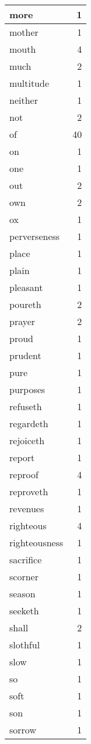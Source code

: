 \begin{center}
\begin{longtable}{l|r}
more & 1\\ \hline 
mother & 1\\ \hline 
mouth & 4\\ \hline 
much & 2\\ \hline 
multitude & 1\\ \hline 
neither & 1\\ \hline 
not & 2\\ \hline 
of & 40\\ \hline 
on & 1\\ \hline 
one & 1\\ \hline 
out & 2\\ \hline 
own & 2\\ \hline 
ox & 1\\ \hline 
perverseness & 1\\ \hline 
place & 1\\ \hline 
plain & 1\\ \hline 
pleasant & 1\\ \hline 
poureth & 2\\ \hline 
prayer & 2\\ \hline 
proud & 1\\ \hline 
prudent & 1\\ \hline 
pure & 1\\ \hline 
purposes & 1\\ \hline 
refuseth & 1\\ \hline 
regardeth & 1\\ \hline 
rejoiceth & 1\\ \hline 
report & 1\\ \hline 
reproof & 4\\ \hline 
reproveth & 1\\ \hline 
revenues & 1\\ \hline 
righteous & 4\\ \hline 
righteousness & 1\\ \hline 
sacrifice & 1\\ \hline 
scorner & 1\\ \hline 
season & 1\\ \hline 
seeketh & 1\\ \hline 
shall & 2\\ \hline 
slothful & 1\\ \hline 
slow & 1\\ \hline 
so & 1\\ \hline 
soft & 1\\ \hline 
son & 1\\ \hline 
sorrow & 1\\ \hline 

\end{longtable}
\end{center}
